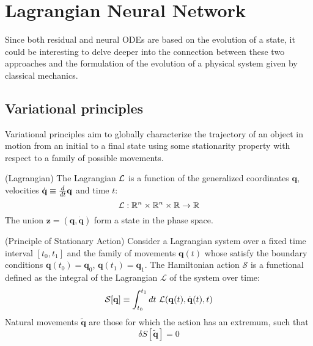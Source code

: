 \section{Lagrangian Neural Network}
Since both residual and neural ODEs are based on the evolution of a state, 
it could be interesting to delve deeper into the connection between these two approaches and the formulation of the evolution of a physical system given by classical mechanics.

\subsection{Variational principles}
Variational principles aim to globally characterize the trajectory of an object in motion from an initial to a final state 
using some stationarity property with respect to a family of possible movements.
\begin{definition}(Lagrangian)
    The Lagrangian ${\cal L}$ is a function of the generalized coordinates $\mathbf{q}$, velocities $\dot{\mathbf{q}} \equiv \frac{d}{dt}\mathbf{q}$ and time $t$:
    $${\cal L} : \mathbb{R}^n \times \mathbb{R}^n \times \mathbb{R} \rightarrow \mathbb{R}$$
    The union $\mathbf{z} = (\mathbf{q}, \dot{\mathbf{q}})$ form a state in the phase space.
\end{definition}

\begin{theorem}(Principle of Stationary Action)
    Consider a Lagrangian system over a fixed time interval $[t_0, t_1]$ and the family of movements $\mathbf{q}(t)$ 
    whose satisfy the boundary conditions $\mathbf{q}(t_0) = \mathbf{q}_0$, $\mathbf{q}(t_1) = \mathbf{q}_1$. 
    The Hamiltonian action $\mathcal{S}$ is a functional defined as the integral of the Lagrangian $\mathcal{L}$ of the system over time:
    $$\mathcal{S}[\mathbf{q}] \equiv \int_{t_0}^{t_1} dt\ {\cal L}(\mathbf{q}(t), \dot{\mathbf{q}}(t), t)$$
    Natural movements $\mathbf{\tilde{q}}$ are those for which the action has an extremum, such that
    $$\delta S[\mathbf{\tilde{q}}] = 0$$
\end{theorem}

